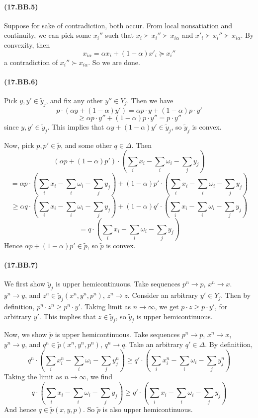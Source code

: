 \documentclass[10pt,letter]{article}
\begin{document}
\paragraph{(17.BB.5)}
Suppose for sake of contradiction, both occur. From local nonsatiation and continuity, we can pick some $x_i''$ such that $x_i \succ x_i'' \succ x_{i\alpha}$ and $x'_i \succ x_i'' \succ x_{i\alpha}$. By convexity, then
\[ x_{i\alpha} = \alpha x_i + (1-\alpha) x'_i \succeq x_i'' \]
a contradiction of $x_i'' \succ x_{i\alpha}$. So we are done.
\paragraph{(17.BB.6)}
Pick $y, y' \in \tilde{y}_j$, and fix any other $y'' \in Y_j$. Then we have
\[ p \cdot(\alpha y + (1-\alpha)y') = \alpha p \cdot y + (1-\alpha) p \cdot y' \]
\[ \ge \alpha p \cdot y'' + (1-\alpha) p \cdot y'' = p \cdot y'' \]
since $y, y' \in \tilde{y}_j$. This implies that $\alpha y + (1-\alpha)y' \in \tilde{y}_j$, so $\tilde{y}_j$ is convex.

Now, pick $p, p' \in \tilde{p}$, and some other $q \in \Delta$. Then
\[ (\alpha p + (1-\alpha)p')\cdot \left( \sum_i x_i  - \sum_i \omega_i - \sum_j y_j \right) \]
\[ = \alpha p \cdot \left( \sum_i x_i  - \sum_i \omega_i - \sum_j y_j \right) + (1-\alpha) p' \cdot \left( \sum_i x_i  - \sum_i \omega_i - \sum_j y_j \right) \]
\[ \ge \alpha q \cdot \left( \sum_i x_i  - \sum_i \omega_i - \sum_j y_j \right) + (1-\alpha) q' \cdot \left( \sum_i x_i  - \sum_i \omega_i - \sum_j y_j \right) \]
\[ = q \cdot \left( \sum_i x_i  - \sum_i \omega_i - \sum_j y_j \right) \]
Hence $\alpha p + (1-\alpha)p' \in \tilde{p}$, so $\tilde{p}$ is convex.


\paragraph{(17.BB.7)}
We first show $\tilde{y}_j$ is upper hemicontinuous. Take sequences $p^n \to p$, $x^n \to x$. $y^n \to y$, and $z^n \in \tilde{y}_j(x^n, y^n, p^n)$, $z^n \to z$. Consider an arbitrary $y' \in Y_j$. Then by definition, $p^n \cdot z^n \ge p^n \cdot y'$. Taking limit as $n \to \infty$, we get $p \cdot z \ge p \cdot y'$, for arbitrary $y'$. This implies that $z \in \tilde{y}_j$, so $\tilde{y}_j$ is upper hemicontinuous.

Now, we show $\tilde{p}$ is upper hemicontinuous. Take sequences $p^n \to p$, $x^n \to x$, $y^n \to y$, and $q^n \in \tilde{p}(x^n, y^n, p^n)$, $q^n \to q$. Take an arbitrary $q' \in \Delta$. By definitiion,
\[ q^n \cdot \left( \sum_i x^n_i - \sum_i \omega_i - \sum_j y^n_j \right) \ge q' \cdot \left( \sum_i x^n_i - \sum_i \omega_i - \sum_j y^n_j \right)  \]
Taking the limit as $n \to \infty$, we find
\[ q \cdot \left( \sum_i x_i - \sum_i \omega_i - \sum_j y_j \right) \ge q' \cdot \left( \sum_i x_i - \sum_i \omega_i - \sum_j y_j \right)  \]
And hence $q \in \tilde{p}(x,y,p)$. So $\tilde{p}$ is also upper hemicontinuous.
\end{document}
